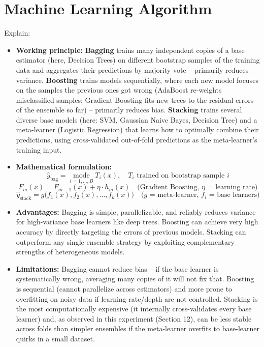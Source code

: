 \documentclass[12pt,a4paper]{article}
\begin{document}
\section{Machine Learning Algorithm}
Explain:
\begin{itemize}
\item \textbf{Working principle:} \textbf{Bagging} trains many independent copies of a base
estimator (here, Decision Trees) on different bootstrap samples of the training data and
aggregates their predictions by majority vote -- primarily reduces variance. \textbf{Boosting}
trains models sequentially, where each new model focuses on the samples the previous ones
got wrong (AdaBoost re-weights misclassified samples; Gradient Boosting fits new trees to the
residual errors of the ensemble so far) -- primarily reduces bias. \textbf{Stacking} trains
several diverse base models (here: SVM, Gaussian Naive Bayes, Decision Tree) and a
meta-learner (Logistic Regression) that learns how to optimally combine their predictions,
using cross-validated out-of-fold predictions as the meta-learner's training input.
\item \textbf{Mathematical formulation:}
$$\hat{y}_{\text{bag}} = \operatorname*{mode}_{i=1,\dots,B} T_i(x), \quad T_i \text{ trained on bootstrap sample } i$$
$$F_m(x) = F_{m-1}(x) + \eta \cdot h_m(x) \quad \text{(Gradient Boosting, } \eta \text{ = learning rate)}$$
$$\hat{y}_{\text{stack}} = g\big(f_1(x), f_2(x), \dots, f_k(x)\big) \quad \text{(} g \text{ = meta-learner, } f_i \text{ = base learners)}$$
\item \textbf{Advantages:} Bagging is simple, parallelizable, and reliably reduces variance
for high-variance base learners like deep trees. Boosting can achieve very high accuracy by
directly targeting the errors of previous models. Stacking can outperform any single
ensemble strategy by exploiting complementary strengths of heterogeneous models.
\item \textbf{Limitations:} Bagging cannot reduce bias -- if the base learner is
systematically wrong, averaging many copies of it will not fix that. Boosting is sequential
(cannot parallelize across estimators) and more prone to overfitting on noisy data if
learning rate/depth are not controlled. Stacking is the most computationally expensive (it
internally cross-validates every base learner) and, as observed in this experiment
(Section 12), can be less stable across folds than simpler ensembles if the meta-learner
overfits to base-learner quirks in a small dataset.
\end{itemize}
\end{document}
